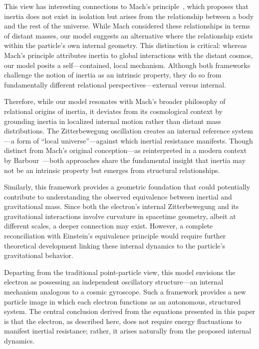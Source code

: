 \documentclass[%
 reprint,
 amsmath,amssymb,
 aps,
]{revtex4-1}
\numberwithin{equation}{section}%
\begin{document}
This view has interesting connections to Mach's principle~\cite{mach1919}, which proposes that inertia does not exist in isolation but arises from the relationship between a body and the rest of the universe. While Mach considered these relationships in terms of distant masses, our model suggests an alternative where the relationship exists within the particle's own internal geometry. This distinction is critical: whereas Mach's principle attributes inertia to global interactions with the distant cosmos, our model posits a self---contained, local mechanism. Although both frameworks challenge the notion of inertia as an intrinsic property, they do so from fundamentally different relational perspectives---external versus internal.

Therefore, while our model resonates with Mach’s broader philosophy of relational origins of inertia, it deviates from its cosmological context by grounding inertia in localized internal motion rather than distant mass distributions.
The Zitterbewegung oscillation creates an internal reference system—a form of ``local universe''—against which inertial resistance manifests. Though distinct from Mach's original conception—as reinterpreted in a modern context by Barbour~\cite{barbour2001}—both approaches share the fundamental insight that inertia may not be an intrinsic property but emerges from structural relationships.

Similarly, this framework provides a geometric foundation that could potentially contribute to understanding the observed equivalence between inertial and gravitational mass. Since both the electron's internal Zitterbewegung and its gravitational interactions involve curvature in spacetime geometry, albeit at different scales, a deeper connection may exist. However, a complete reconciliation with Einstein's equivalence principle would require further theoretical development linking these internal dynamics to the particle's gravitational behavior.

Departing from the traditional point-particle view, this model envisions the electron as possessing an independent oscillatory structure—an internal mechanism analogous to a cosmic gyroscope. Such a framework provides a new particle image in which each electron functions as an autonomous, structured system. The central conclusion derived from the equations presented in this paper is that the electron, as described here, does not require energy fluctuations to manifest inertial resistance; rather, it arises naturally from the proposed internal dynamics.
\end{document}
